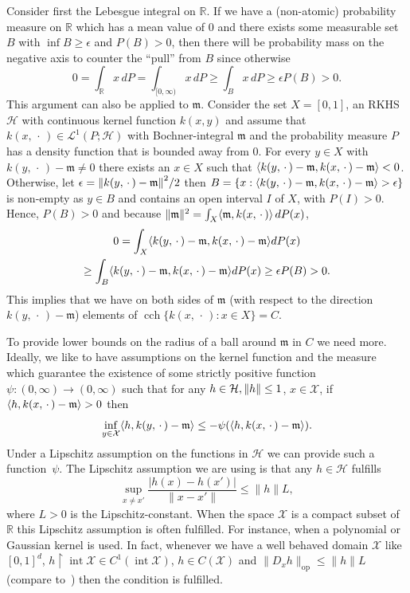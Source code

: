 \documentclass[AHL,Unicode,longabstracts,published]{cedram}
\theoremstyle{remark}
\DeclareMathOperator{\cch}{cch}
\DeclareMathOperator{\opp}{op}
\DeclareMathOperator{\intr}{int}
\newcommand{\resttr}
{\!\upharpoonright\!}
\newcommand{\R}{\mathbb{R}}
\newcommand{\X}{\mathcal{X}}
\newcommand{\cH}{\mathcal{H}}
\newcommand{\clL}{\mathcal{L}}
\newcommand{\mean}{\mathfrak{m}}
\providecommand{\norm}[1]{\left\lVert#1\right\rVert}
\providecommand{\inner}[2]{\left\langle #1,#2\right\rangle}
\let\originalleft\left
\let\originalright\right
\renewcommand{\left}{\mathopen{}\mathclose\bgroup\originalleft}
\renewcommand{\right}{\aftergroup\egroup\originalright}
\begin{document}
Consider first the Lebesgue integral on $\R$. If we have a (non-atomic) probability measure on $\R$ which has a mean value of $0$ and there exists some measurable set $B$ with $\inf B \geq \epsilon$ and $P(B) > 0$, then there will be probability mass on the negative axis to counter the ``pull'' from $B$ since otherwise
\[
0 = \int_{\R} x \,dP = \int_{[0,\infty)} x \, dP \geq \int_{B} x \,dP \geq \epsilon P(B) > 0.
\]
This argument can also be applied to $\mean$. Consider the set $X=[0,1]$, an RKHS $\cH$ with continuous kernel function $k(x,y)$ and assume that $k(x,\,\cdot\,) \in \clL^1(P;\cH)$ with Bochner-integral $\mean$ and the probability measure $P$ has a density function that is bounded away from $0$. For every $y \in X$ with $k(y,\,\cdot\,) - \mean \not = 0$ there exists an $x \in X$ such that $\inner{k(y,\,\cdot\,) - \mean}{k(x,\,\cdot\,) - \mean} < 0$. Otherwise, let $\epsilon = \norm{k(y,\,\cdot\,) - \mean}^2/2$ then $B = \{x: \inner{k(y,\,\cdot\,) - \mean}{k(x,\,\cdot\,) - \mean} > \epsilon \}$ is non-empty as $y \in B$ and contains\pagebreak{} an open interval $I$ of $X$, with $P(I)>0$. Hence, $P(B) > 0$ and because $\|\mean\|^2 = \int_X \inner{\mean}{k(x,\,\cdot\,)} \,dP(x)$,
\begin{multline*}
0 =
\int_{X} \inner{k(y,\,\cdot\,) - \mean}{k(x,\,\cdot\,) - \mean} dP(x)\\ \geq \int_B \inner{k(y,\,\cdot\,) - \mean}{k(x,\,\cdot\,) - \mean} dP(x) \geq \epsilon P(B) >0.
\end{multline*}
This implies that we have on both sides of $\mean$ (with respect to the direction $k(y,\,\cdot\,) - \mean$) elements of $\cch \{k(x,\,\cdot\,) : x \in X\} = C$.

To provide lower bounds on the radius of a ball around $\mean$ in $C$ we need more. Ideally, we like to have assumptions on the kernel function and the measure which guarantee the existence of some strictly positive function $\psi:(0,\infty) \rightarrow (0,\infty)$ such that for any $h \in \cH, \norm{h} \leq 1$, $x \in \X$, if $\inner{h}{k(x,\,\cdot\,) - \mean} > 0 $ then
\[
\inf_{y \in \X} \inner{h}{k(y,\,\cdot\,)-\mean} \leq - \psi(\inner{h}{k(x,\,\cdot\,) - \mean}).
\]
Under a Lipschitz assumption on the functions in $\cH$ we can provide such a function~$\psi$. The Lipschitz assumption we are using is that any $h \in \cH$ fulfills
\begin{equation}\label{def:Lip_for_RKHS}
\sup_{x \not = x'} \frac{|h(x) - h(x')|}{\|x-x'\|} \leq \|h\| L,
\end{equation}
where $L >0 $ is the Lipschitz-constant. When the space $\X$ is a compact subset of~$\R$ this Lipschitz assumption is often fulfilled. For instance, when a polynomial or Gaussian kernel is used. In fact, whenever we have a well behaved domain $\X$ like $[0,1]^d$, $h \resttr \intr \X \in C^1(\intr \X)$, $h \in C(\X)$ and $\|D_x h\|_{\opp} \leq \|h\| L$ (compare to~\cite[Corollary~4.36]{STEIN08}) then the condition is fulfilled.
\end{document}
